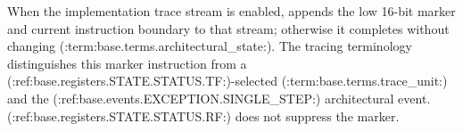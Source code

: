 When the implementation trace stream is enabled, appends the low 16-bit marker and current instruction boundary to that stream; otherwise it completes without changing (:term:base.terms.architectural_state:). The tracing terminology distinguishes this marker instruction from a (:ref:base.registers.STATE.STATUS.TF:)-selected (:term:base.terms.trace_unit:) and the (:ref:base.events.EXCEPTION.SINGLE_STEP:) architectural event. (:ref:base.registers.STATE.STATUS.RF:) does not suppress the marker.
